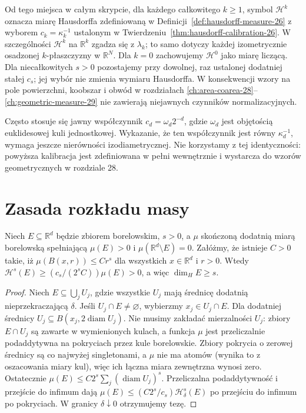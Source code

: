 \begin{uwaga}
\label{rem:hausdorff-convention-26}
Od tego miejsca w całym skrypcie, dla każdego całkowitego
$k\ge1$, symbol $\mathcal H^k$ oznacza miarę Hausdorffa
zdefiniowaną w Definicji~\ref{def:hausdorff-measure-26}
z wyborem $c_k=\kappa_k^{-1}$ ustalonym w
Twierdzeniu~\ref{thm:hausdorff-calibration-26}.
W szczególności $\mathcal H^k$ na $\mathbb R^k$
zgadza się z $\lambda_k$; to samo dotyczy każdej
izometrycznie osadzonej $k$-płaszczyzny w $\mathbb R^N$.
Dla $k=0$ zachowujemy $\mathcal H^0$ jako miarę liczącą.
Dla niecałkowitych $s>0$ pozostajemy przy dowolnej,
raz ustalonej dodatniej stałej $c_s$; jej wybór nie
zmienia wymiaru Hausdorffa. W konsekwencji wzory
na pole powierzchni, koobszar i obwód w rozdziałach
\ref{ch:area-coarea-28}--\ref{ch:geometric-measure-29}
nie zawierają niejawnych czynników normalizacyjnych.
\end{uwaga}

\begin{uwaga}
Często stosuje się jawny współczynnik
$c_d=\omega_d2^{-d}$, gdzie $\omega_d$ jest
objętością euklidesowej kuli jednostkowej.
Wykazanie, że ten współczynnik jest równy
$\kappa_d^{-1}$, wymaga jeszcze nierówności
izodiametrycznej. Nie korzystamy z tej
identyczności: powyższa kalibracja jest
zdefiniowana w pełni wewnętrznie i wystarcza
do wzorów geometrycznych w rozdziale 28.
\end{uwaga}

\section{Zasada rozkładu masy}
\begin{twierdzenie}
\label{thm:mass-distribution-26}
Niech $E\subseteq\mathbb R^d$ będzie zbiorem borelowskim,
$s>0$, a $\mu$ skończoną dodatnią miarą borelowską
spełniającą $\mu(E)>0$ i $\mu(\mathbb R^d\setminus E)=0$.
Załóżmy, że istnieje $C>0$ takie, iż
$\mu(B(x,r))\le Cr^s$ dla wszystkich
$x\in\mathbb R^d$ i $r>0$. Wtedy
$\mathcal H^s(E)\ge(c_s/(2^sC))\mu(E)>0$,
a więc $\dim_HE\ge s$.
\end{twierdzenie}
\begin{proof}
Niech $E\subseteq\bigcup_jU_j$, gdzie wszystkie
$U_j$ mają średnicę dodatnią nieprzekraczającą $\delta$.
Jeśli $U_j\cap E\ne\varnothing$, wybierzmy
$x_j\in U_j\cap E$. Dla dodatniej średnicy
$U_j\subseteq B(x_j,2\operatorname{diam}U_j)$.
Nie musimy zakładać mierzalności $U_j$: zbiory
$E\cap U_j$ są zawarte w wymienionych kulach,
a funkcja $\mu$ jest przeliczalnie podaddytywna
na pokryciach przez kule borelowskie. Zbiory pokrycia
o zerowej średnicy są co najwyżej singletonami,
a $\mu$ nie ma atomów (wynika to z oszacowania
miary kul), więc ich łączna miara zewnętrzna
wynosi zero. Ostatecznie
$\mu(E)\le C2^s\sum_j(\operatorname{diam}U_j)^s$.
Przeliczalna podaddytywność i przejście do infimum dają
$\mu(E)\le(C2^s/c_s)\mathcal H^s_\delta(E)$
po przejściu do infimum po pokryciach. W granicy
$\delta\downarrow0$ otrzymujemy tezę.
\end{proof}

